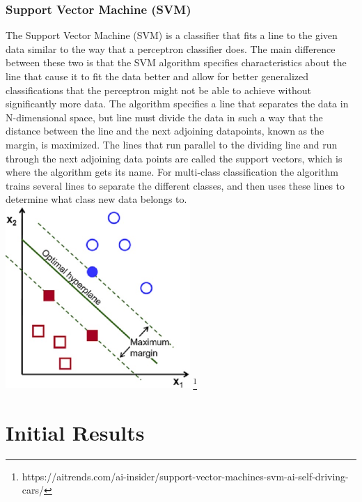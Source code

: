 \documentclass{article}
\begin{document}
            \subsubsection{Support Vector Machine (SVM)}
            The Support Vector Machine (SVM) is a classifier that fits a line to the given data 
            similar to the way that a perceptron classifier does. The main difference between 
            these two is that the SVM algorithm specifies characteristics about the line that 
            cause it to fit the data better and allow for better generalized classifications that 
            the perceptron might not be able to achieve without significantly more data. The 
            algorithm specifies a line that separates the data in N-dimensional space, but line 
            must divide the data in such a way that the distance between the line and the next 
            adjoining datapoints, known as the margin, is maximized. The lines that run parallel 
            to the dividing line and run through the next adjoining data points are called the 
            support vectors, which is where the algorithm gets its name. For multi-class 
            classification the algorithm trains several lines to separate the different classes, 
            and then uses these lines to determine what class new data belongs to.
            \includegraphics[width=7cm]{graphs/SVM_description}
            \footnote{https://aitrends.com/ai-insider/support-vector-machines-svm-ai-self-driving-cars/}
        
    \section{Initial Results}
\end{document}
